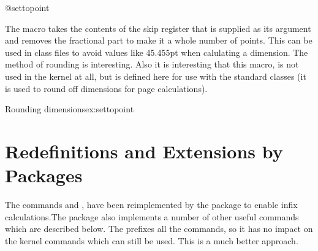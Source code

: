 \begin{docCommand}{@settopoint} {}

The 
 macro takes the contents of the skip register that is supplied as its argument
and removes the fractional part to make it a whole number of points. This can be
used in class files to avoid values like 45.455pt when calulating a dimension. The method of
rounding is interesting. Also it is interesting that this macro, is not used in the kernel at all, but is defined
here for use with the standard classes (it is used to round off dimensions for page calculations).
\end{docCommand}

\begin{texexample}{Rounding dimensions}{ex:settopoint}
\bgroup 
  \makeatletter
  \def\@settopoint#1{\divide#1\p@\multiply#1\p@}
  \newlength\@test
  \setlength\@test{19.5pt}
  \@settopoint{\@test}
  \the\@test
  \makeatother
\egroup  
\end{texexample}

\section{Redefinitions and Extensions by Packages}

The commands  and ,  have been reimplemented by the package  to enable infix calculations.The package also implements a number of other useful
commands which are described below. The  prefixes all the commands, so it has no impact on the kernel commands which can still be used. This is a much better approach. 

